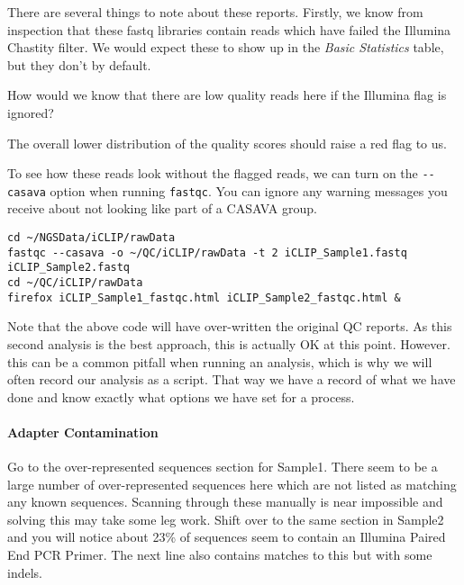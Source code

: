 There are several things to note about these reports.
Firstly, we know from inspection that these fastq libraries contain reads which have failed the Illumina Chastity filter.
We would expect these to show up in the \textit{Basic Statistics} table, but they don't by default.

\begin{questions}
How would we know that there are low quality reads here if the Illumina flag is ignored?\\
\begin{answer}
The overall lower distribution of the quality scores should raise a red flag to us. \\
\end{answer}
\end{questions}

To see how these reads look without the flagged reads, we can turn on the \texttt{-{}-casava} option when running \texttt{fastqc}.
You can ignore any warning messages you receive about not looking like part of a CASAVA group.

\begin{lstlisting}
cd ~/NGSData/iCLIP/rawData
fastqc --casava -o ~/QC/iCLIP/rawData -t 2 iCLIP_Sample1.fastq iCLIP_Sample2.fastq
cd ~/QC/iCLIP/rawData
firefox iCLIP_Sample1_fastqc.html iCLIP_Sample2_fastqc.html &
\end{lstlisting}

\begin{information}
Note that the above code will have over-written the original QC reports.
As this second analysis is the best approach, this is actually OK at this point.
However. this can be a common pitfall when running an analysis, which is why we will often record our analysis as a script.
That way we have a record of what we have done and know exactly what options we have set for a process.
\end{information}


\paragraph{Adapter Contamination}
Go to the over-represented sequences section for Sample1.
There seem to be a large number of over-represented sequences here which are not listed as matching any known sequences.
Scanning through these manually is near impossible and solving this may take some leg work.
Shift over to the same section in Sample2 and you will notice about 23\% of sequences seem to contain an Illumina Paired End PCR Primer.
The next line also contains matches to this but with some indels. \\

